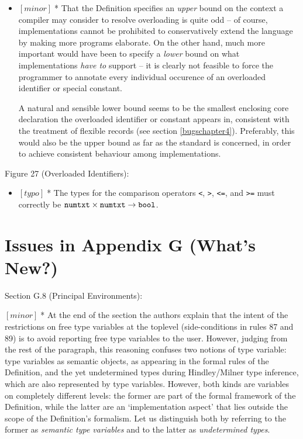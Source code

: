 \documentclass{article}
\newcommand{\m}[1]{$[\mathit{#1}]\;$}
\newcommand{\minor}{\m{minor}}
\newcommand{\typo}{\m{typo}}
\begin{document}
\begin{itemize}
\item \minor * That the Definition specifies an {\em upper} bound on the context a compiler may consider to resolve overloading is quite odd -- of course, implementations cannot be prohibited to conservatively extend the language by making more programs elaborate. On the other hand, much more important would have been to specify a {\em lower} bound on what implementations {\em have to} support -- it is clearly not feasible to force the programmer to annotate every individual occurence of an overloaded identifier or special constant.

A natural and sensible lower bound seems to be the smallest enclosing core declaration the overloaded identifier or constant appears in, consistent with the treatment of flexible records (see section \ref{bugschapter4}). Preferably, this would also be the upper bound as far as the standard is concerned, in order to achieve consistent behaviour among implementations.
\end{itemize}


Figure 27 (Overloaded Identifiers):
\nopagebreak

\begin{itemize}
\item \typo * The types for the comparison operators {\tt<}, {\tt>}, {\tt<=}, and {\tt>=} must correctly be ${\tt numtxt} \times {\tt numtxt} \to {\tt bool}$.
\end{itemize}


\section{Issues in Appendix G (What's New?)}
\label{bugsappendixg}

Section G.8 (Principal Environments):
\nopagebreak

\minor * At the end of the section the authors explain that the intent of the restrictions on free type variables at the toplevel (side-conditions in rules 87 and 89) is to avoid reporting free type variables to the user. However, judging from the rest of the paragraph, this reasoning confuses two notions of type variable: type variables as semantic objects, as appearing in the formal rules of the Definition, and the yet undetermined types during Hindley/Milner type inference, which are also represented by type variables. However, both kinds are variables on completely different levels: the former are part of the formal framework of the Definition, while the latter are an `implementation aspect' that lies outside the scope of the Definition's formalism. Let us distinguish both by referring to the former as {\em semantic type variables} and to the latter as {\em undetermined types}.
\end{document}
